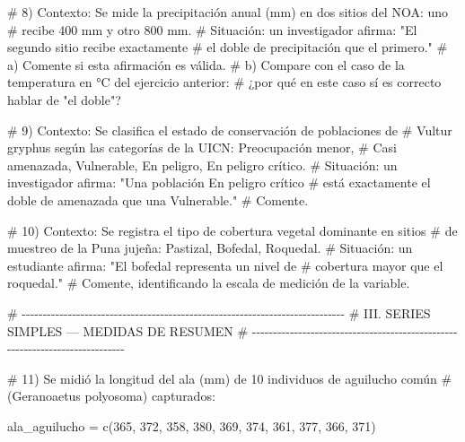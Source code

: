 \documentclass[
  spanish,
  letterpaper,
  DIV=11,
  numbers=noendperiod]{scrreprt}
\newenvironment{Shaded}{\begin{snugshade}}{\end{snugshade}}
\newcommand{\CommentTok}[1]{\textcolor[rgb]{0.37,0.37,0.37}{#1}}
\newcommand{\DecValTok}[1]{\textcolor[rgb]{0.68,0.00,0.00}{#1}}
\newcommand{\FunctionTok}[1]{\textcolor[rgb]{0.28,0.35,0.67}{#1}}
\newcommand{\NormalTok}[1]{\textcolor[rgb]{0.00,0.23,0.31}{#1}}
\newcommand{\OtherTok}[1]{\textcolor[rgb]{0.00,0.23,0.31}{#1}}
\begin{document}
\begin{Shaded}
\begin{Highlighting}[]
\CommentTok{\# 8) Contexto: Se mide la precipitación anual (mm) en dos sitios del NOA: uno}
\CommentTok{\#    recibe 400 mm y otro 800 mm.}
\CommentTok{\#    Situación: un investigador afirma: "El segundo sitio recibe exactamente}
\CommentTok{\#    el doble de precipitación que el primero."}
\CommentTok{\#    a) Comente si esta afirmación es válida.}
\CommentTok{\#    b) Compare con el caso de la temperatura en °C del ejercicio anterior:}
\CommentTok{\#       ¿por qué en este caso sí es correcto hablar de "el doble"?}


\CommentTok{\# 9) Contexto: Se clasifica el estado de conservación de poblaciones de}
\CommentTok{\#    Vultur gryphus según las categorías de la UICN: Preocupación menor,}
\CommentTok{\#    Casi amenazada, Vulnerable, En peligro, En peligro crítico.}
\CommentTok{\#    Situación: un investigador afirma: "Una población \textquotesingle{}En peligro crítico\textquotesingle{}}
\CommentTok{\#    está exactamente el doble de amenazada que una \textquotesingle{}Vulnerable\textquotesingle{}."}
\CommentTok{\#    Comente.}


\CommentTok{\# 10) Contexto: Se registra el tipo de cobertura vegetal dominante en sitios}
\CommentTok{\#     de muestreo de la Puna jujeña: Pastizal, Bofedal, Roquedal.}
\CommentTok{\#     Situación: un estudiante afirma: "El bofedal representa un nivel de}
\CommentTok{\#     cobertura mayor que el roquedal."}
\CommentTok{\#     Comente, identificando la escala de medición de la variable.}


\CommentTok{\# {-}{-}{-}{-}{-}{-}{-}{-}{-}{-}{-}{-}{-}{-}{-}{-}{-}{-}{-}{-}{-}{-}{-}{-}{-}{-}{-}{-}{-}{-}{-}{-}{-}{-}{-}{-}{-}{-}{-}{-}{-}{-}{-}{-}{-}{-}{-}{-}{-}{-}{-}{-}{-}{-}{-}{-}{-}{-}{-}{-}{-}{-}{-}{-}{-}{-}{-}{-}{-}{-}{-}{-}{-}{-}{-}{-}{-}}
\CommentTok{\# III. SERIES SIMPLES — MEDIDAS DE RESUMEN}
\CommentTok{\# {-}{-}{-}{-}{-}{-}{-}{-}{-}{-}{-}{-}{-}{-}{-}{-}{-}{-}{-}{-}{-}{-}{-}{-}{-}{-}{-}{-}{-}{-}{-}{-}{-}{-}{-}{-}{-}{-}{-}{-}{-}{-}{-}{-}{-}{-}{-}{-}{-}{-}{-}{-}{-}{-}{-}{-}{-}{-}{-}{-}{-}{-}{-}{-}{-}{-}{-}{-}{-}{-}{-}{-}{-}{-}{-}{-}{-}}

\CommentTok{\# 11) Se midió la longitud del ala (mm) de 10 individuos de aguilucho común}
\CommentTok{\#     (Geranoaetus polyosoma) capturados:}

\NormalTok{ala\_aguilucho }\OtherTok{=} \FunctionTok{c}\NormalTok{(}\DecValTok{365}\NormalTok{, }\DecValTok{372}\NormalTok{, }\DecValTok{358}\NormalTok{, }\DecValTok{380}\NormalTok{, }\DecValTok{369}\NormalTok{, }\DecValTok{374}\NormalTok{, }\DecValTok{361}\NormalTok{, }\DecValTok{377}\NormalTok{, }\DecValTok{366}\NormalTok{, }\DecValTok{371}\NormalTok{)}


\end{Highlighting}
\end{Shaded}
\end{document}
